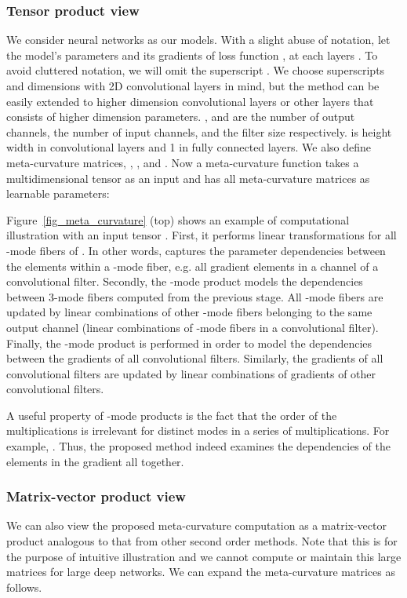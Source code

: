 \documentclass{article}
\begin{document}
\subsubsection{Tensor product view}
We consider neural networks as our models. With a slight abuse of notation, let the model's parameters  and its gradients of loss function , at each layers . To avoid cluttered notation, we will omit the superscript . We choose superscripts and dimensions with 2D convolutional layers in mind, but the method can be easily extended to higher dimension convolutional layers or other layers that consists of higher dimension parameters. , and  are the number of output channels, the number of input channels, and the filter size  respectively.  is height  width in convolutional layers and 1 in fully connected layers. We also define meta-curvature matrices, , , and . Now a meta-curvature function takes a multidimensional tensor as an input and has all meta-curvature matrices as learnable parameters:

Figure~\ref{fig_meta_curvature} (top) shows an example of computational illustration with an input tensor . First, it performs linear transformations for all -mode fibers of . In other words,  captures the parameter dependencies between the elements within a -mode fiber, e.g. all gradient elements in a channel of a convolutional filter. Secondly, the -mode product models the dependencies between 3-mode fibers computed from the previous stage. All -mode fibers are updated by linear combinations of other -mode fibers belonging to the same output channel (linear combinations of -mode fibers in a convolutional filter). Finally, the -mode product is performed in order to model the dependencies between the gradients of all convolutional filters. Similarly, the gradients of all convolutional filters are updated by linear combinations of gradients of other convolutional filters. 

A useful property of -mode products is the fact that the order of the multiplications is irrelevant for distinct modes in a series of multiplications. For example, . Thus, the proposed method indeed examines the dependencies of the elements in the gradient all together. 


\subsubsection{Matrix-vector product view}
We can also view the proposed meta-curvature computation as a matrix-vector product analogous to that from other second order methods. Note that this is for the purpose of intuitive illustration and we cannot compute or maintain this large matrices for large deep networks. We can expand the meta-curvature matrices as follows.
\end{document}
